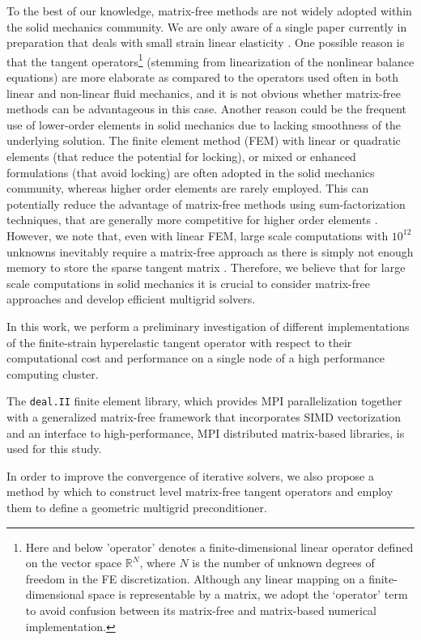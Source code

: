 \documentclass[times,doublespace]{nmeauth}
\newcommand{\changeDD}[1]{#1}
\newcommand{\changeJP}[1]{#1}
\begin{document}
To the best of our knowledge, matrix-free methods are not widely adopted within the solid mechanics community.
We are only aware of a single paper currently in preparation that deals with small strain linear elasticity \cite{Clevenger2018}.
One possible reason is that the tangent operators\footnote{Here and
below 'operator' denotes a finite-dimensional linear operator defined on the vector space $\mathbb R^N$, where $N$ is the number of unknown degrees of freedom in the FE discretization.
Although any linear mapping on a finite-dimensional space is representable by a matrix, we adopt the `operator' term to avoid confusion between its matrix-free and matrix-based numerical implementation.
} (stemming from linearization of the nonlinear balance equations) are
more elaborate as compared to the operators used often in both linear and non-linear fluid mechanics, and it is not obvious whether matrix-free methods can be advantageous in this case.
Another reason could be the frequent use of lower-order elements in solid mechanics due to lacking smoothness of the underlying solution.
The finite element method (FEM) with linear or quadratic elements (that reduce the potential for locking), or mixed or enhanced formulations (that avoid locking) are often adopted in the solid mechanics community,
whereas higher order elements are rarely employed.
This can potentially reduce the advantage of matrix-free methods using sum-factorization techniques, that are generally more competitive for higher order elements \cite{kronbichler12,kronbichler2017fast,muthing2017high}.
However, we note that, even with linear FEM, large scale computations with $10^{12}$ unknowns inevitably require a matrix-free approach as there is simply not enough memory to store the sparse tangent matrix \cite{Gmeiner2016}. Therefore, we believe that for large scale computations in solid mechanics it is crucial to consider matrix-free approaches and develop efficient multigrid solvers.

In this work, we perform \changeJP{a preliminary investigation of} different implementations of the finite-strain hyperelastic tangent operator with respect to their computational cost
and performance \changeDD{ on a single node of a high performance computing cluster.}
\changeJP{
The \texttt{deal.II} \cite{dealII90} finite element library, which provides MPI parallelization together with a \changeJP{generalized matrix-free framework that incorporates SIMD vectorization} and an interface to high-performance, MPI distributed matrix-based libraries, is used for this study.
}
In order to improve the convergence of iterative solvers, we also propose a method by which to construct level matrix-free tangent operators
and employ them to define a \mbox{geometric} multigrid preconditioner.
\end{document}
